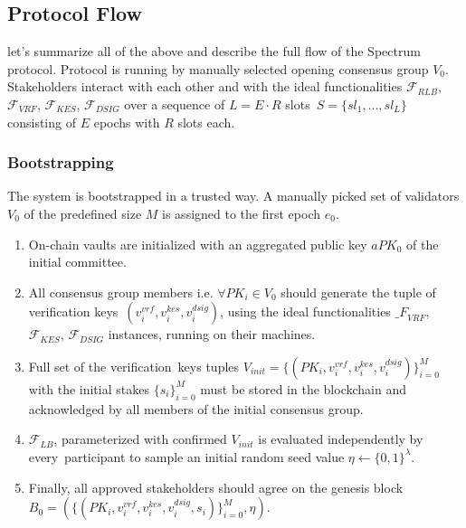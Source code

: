 \subsection{Protocol Flow}\label{subsec:protocol-flow}
let's summarize all of the above and describe the full flow of the Spectrum protocol.
Protocol is running by manually selected opening consensus group $V_0$.
Stakeholders interact with each other and with the ideal functionalities ${\mathcal{F}}_{RLB}$,\
${\mathcal{F}}_{VRF}$, ${\mathcal{F}}_{KES}$, ${\mathcal{F}}_{DSIG}$ over a sequence of $L = E \cdot R$ slots\
${S=\{sl_1,...,sl_L\}}$ consisting of $E$ epochs with $R$ slots each.

\subsubsection{Bootstrapping}\label{subsubsec:bootstrapping}

The system is bootstrapped in a trusted way.
A manually picked set of validators $V_0$ of the predefined size $M$ is assigned to the first epoch $e_0$.
\begin{enumerate}
    \item On-chain vaults are initialized with an aggregated public key $aPK_0$ of the initial committee.

    \item All consensus group members i.e. $\forall PK_i \in V_0$ should generate the tuple of verification keys\
    ${(v_i^{vrf}, v_i^{kes}, v_i^{dsig})}$, using the ideal functionalities ${\mathcal_{F}}_{VRF}$,\
    ${\mathcal{F}}_{KES}$, ${\mathcal{F}}_{DSIG}$ instances, running on their machines.

    \item Full set of the verification\
    keys tuples ${V_{init} = \{(PK_i, v_i^{vrf}, v_i^{kes}, v_i^{dsig})\}_{i=0}^M}$ with the initial stakes $\{s_i\}_{i=0}^M$
    must be stored in the blockchain and acknowledged by all members of the initial consensus group.

    \item ${\mathcal{F}}_{LB}$, parameterized with confirmed $V_{init}$ is evaluated independently by every\
    participant to sample an initial random seed value $\eta \leftarrow \{0, 1\}^\lambda$.

    \item Finally, all approved stakeholders should agree on the genesis block\
    ${B_0=\left(\{(PK_i, v_i^{vrf}, v_i^{kes}, v_i^{dsig}, s_i)\}_{i=0}^M, \eta\right)}$.
\end{enumerate}

